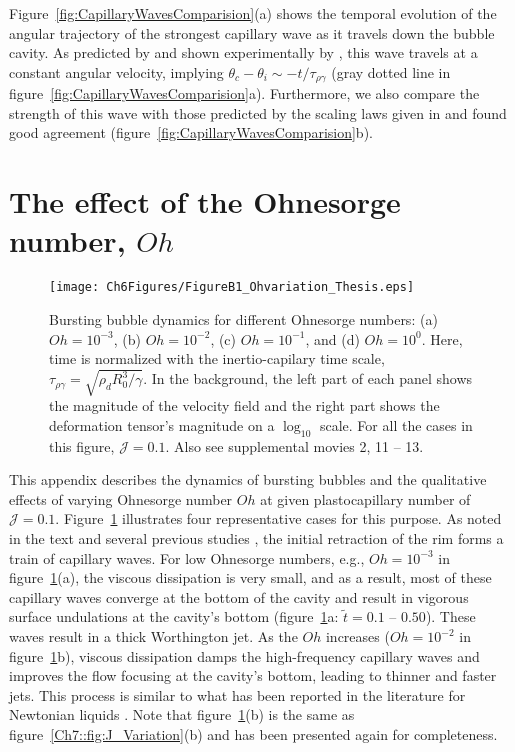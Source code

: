 \begin{subappendices}
Figure~\ref{fig:CapillaryWavesComparision}(a) shows the temporal evolution of the angular trajectory of the strongest capillary wave as it travels down the bubble cavity. As predicted by \citet{gordillo2019capillary} and shown experimentally by \citet{krishnan2017scaling}, this wave travels at a constant angular velocity, implying $\theta_c - \theta_i \sim -t/\tau_{\rho\gamma}$ (gray dotted line in figure~\ref{fig:CapillaryWavesComparision}a). Furthermore, we also compare the strength of this wave with those predicted by the scaling laws given in \citet{gordillo2019capillary} and found good agreement (figure~\ref{fig:CapillaryWavesComparision}b).  

\section{The effect of the Ohnesorge number, $Oh$}\label{App::OhsVariation}

\begin{figure}
	\centering
	\texttt{[image: Ch6Figures/FigureB1\_Ohvariation\_Thesis.eps]}
	\caption{Bursting bubble dynamics for different Ohnesorge numbers: (a) $Oh = 10^{-3}$, (b) $Oh = 10^{-2}$, (c) $Oh = 10^{-1}$, and (d) $Oh = 10^{0}$. Here, time is normalized with the inertio-capilary time scale, $\tau_{\rho\gamma} = \sqrt{\rho_d R_0^3/\gamma}$. In the background, the left part of each panel shows the magnitude of the velocity field and the right part shows the deformation tensor's magnitude on a $\log_{10}$ scale. For all the cases in this figure, $\mathcal{J} = 0.1$. Also see supplemental movies {\color{Myfig} 2, 11 -- 13}.}
	\label{Ch7::fig:Oh_Variation}
\end{figure}

This appendix describes the dynamics of bursting bubbles and the qualitative effects of varying Ohnesorge number $Oh$ at given plastocapillary number of $\mathcal{J}=0.1$. Figure~\ref{Ch7::fig:Oh_Variation} illustrates four representative cases for this purpose. As noted in the text and several previous studies \citep{duchemin2002jet, deike2018dynamics, gordillo2019capillary}, the initial retraction of the rim forms a train of capillary waves. For low Ohnesorge numbers, e.g., $Oh = 10^{-3}$ in figure~\ref{Ch7::fig:Oh_Variation}(a), the viscous dissipation is very small, and as a result, most of these capillary waves converge at the bottom of the cavity and result in vigorous surface undulations at the cavity's bottom (figure~\ref{Ch7::fig:Oh_Variation}a: $\tilde t = 0.1$ -- $0.50$). These waves result in a thick Worthington jet. As the $Oh$ increases ($Oh = 10^{-2}$ in figure~\ref{Ch7::fig:Oh_Variation}b), viscous dissipation damps the high-frequency capillary waves and improves the flow focusing at the cavity's bottom, leading to thinner and faster jets. This process is similar to what has been reported in the literature for Newtonian liquids \citep{duchemin2002jet, ghabache2014physics, deike2018dynamics}. Note that figure~\ref{Ch7::fig:Oh_Variation}(b) is the same as figure~\ref{Ch7::fig:J_Variation}(b) and has been presented again for completeness. 


\end{subappendices}
